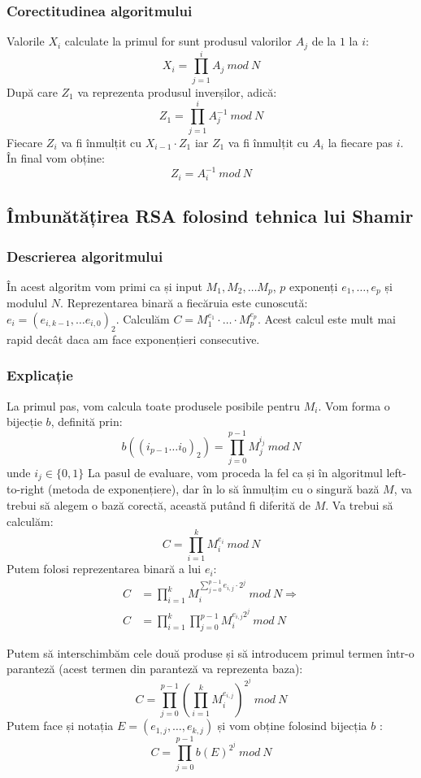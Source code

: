 \documentclass[12]{report}
\begin{document}
		   \subsubsection{Corectitudinea algoritmului}
		   Valorile $X_i$ calculate la primul for sunt produsul valorilor $A_j$ de la $1$ la $i$:
		   $$ X_i=\prod_{j=1}^{i} A_j \ mod \ N$$
		   După care $Z_1$ va reprezenta produsul inverșilor, adică:
		   $$Z_1=\prod_{j=1}^{i} A_{j}^{-1} \ mod \ N$$
		   Fiecare $Z_i$ va fi înmulțit cu $X_{i-1} \cdot   Z_1$ iar $Z_1$ va fi înmulțit cu $A_i$ la fiecare pas $i$. În final vom obține:
		   $$Z_i=A_{i}^{-1} \ mod \ N$$ 
		   \subsection{Îmbunătățirea RSA folosind tehnica lui Shamir}
		   \subsubsection{Descrierea algoritmului}
		   În acest algoritm vom primi ca și input $M_1,M_2, \dots M_p$, $p$ exponenți $e_1, \dots ,e_p$ și modulul $N$. Reprezentarea binară a fiecăruia este cunoscută: $e_i=(e_{i,k-1}, \dots e_{i,0})_2$. Calculăm $C=M_{1}^{e_1} \cdot \dots  \cdot M_{p}^{e_p}$. Acest calcul este mult mai rapid decât daca am face exponențieri consecutive.
		   \subsubsection{Explicație}
		   La primul pas, vom calcula toate produsele posibile pentru $M_i$. Vom forma o bijecție $b$, definită prin: \\
		   $$ b((i_{p-1} \dots i_0)_2)= \prod_{j=0}^{p-1} M^{i_j}_{j} \ mod \ N$$
		   unde $i_j \in \lbrace  0,1  \rbrace $
		   La pasul de evaluare, vom proceda la fel ca și în algoritmul left-to-right (metoda de exponențiere), dar în lo să înmulțim cu o singură bază $M$, va trebui să alegem o bază corectă, această putând fi diferită de $M$. Va trebui să calculăm: 
		   $$ C = \prod_{i=1}^{k} M_{i}^{e_i} \ mod \ N$$
		   Putem folosi reprezentarea binară a lui $e_i$:
		   \begin{align*}
		    C &= \prod_{i=1}^{k} M_{i}^{\sum_{j=0}^{p-1} e_{i,j} \cdot   2^j} \ mod \ N \Rightarrow \\
		    C &= \prod_{i=1}^{k} \prod_{j=0}^{p-1} M_{i}^{e_{i,j}2^j} \ mod \ N
		   \end{align*}
		   
		   Putem să interschimbăm cele două produse și să introducem primul termen într-o paranteză (acest termen din paranteză va reprezenta baza):
		   $$C = \prod_{j=0}^{p-1} \left(   \prod_{i=1}^{k} M_{i}^{e_{i,j}}     \right)^{2^j} \ mod \ N $$
		   Putem face și notația $E=(e_{1,j}, \dots ,e_{k,j})$ și vom obține folosind bijecția $b$ :
		   $$ C = \prod_{j=0}^{p-1} b(E)^{2^j}  \ mod \ N$$
\end{document}
